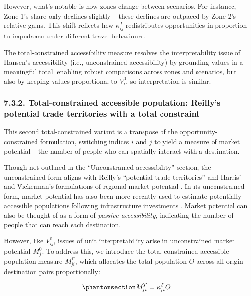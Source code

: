 \documentclass[
  10pt,
  letterpaper,
]{article}
\begin{document}
However, what's notable is how zones change between scenarios. For
instance, Zone 1's share only declines slightly -- these declines are
outpaced by Zone 2's relative gains. This shift reflects how
\(\kappa_{ij}^T\) redistributes opportunities in proportion to impedance
under different travel behaviours.

The total-constrained accessibility measure resolves the
interpretability issue of Hansen's accessibility (i.e., unconstrained
accessibility) by grounding values in a meaningful total, enabling
robust comparisons across zones and scenarios, but also by keeping
values proportional to \(V_i^0\), so interpretation is similar.

\subsubsection{7.3.2. Total-constrained accessible population: Reilly's
potential trade territories with a total
constraint}\label{total-constrained-accessible-population-reillys-potential-trade-territories-with-a-total-constraint}

This second total-constrained variant is a transpose of the
opportunity-constrained formulation, switching indices \(i\) and \(j\)
to yield a measure of market potential -- the number of people who can
spatially interact with a destination.

Though not outlined in the ``Unconstrained accessibility'' section, the
unconstrained form aligns with Reilly's ``potential trade territories''
\citep{reilly1929methods} and Harris' and Vickerman's formulations of
regional market potential
\citep{harris_market_1954, vickermanAccessibilityAttractionPotential1974}.
In its unconstrained form, market potential has also been more recently
used to estimate potentially accessible populations following
infrastructure investments
\citep[e.g.,][]{gutierrezLocationEconomicPotential2001, holl2007twenty, condecco2018road}.
Market potential can also be thought of as a form of \emph{passive
accessibility}, indicating the number of people that can reach each
destination.

However, like \(V_{ij}^0\), issues of unit interpretability arise in
unconstrained market potential \(M_j^0\). To address this, we introduce
the total-constrained accessible population measure \(M^T_{ji}\), which
allocates the total population \(O\) across all origin-destination pairs
proportionally:

\begin{equation}\phantomsection\label{eq-total-constrained-market}{
M^T_{ji} = \kappa_{ji}^T O
}\end{equation}
\end{document}
